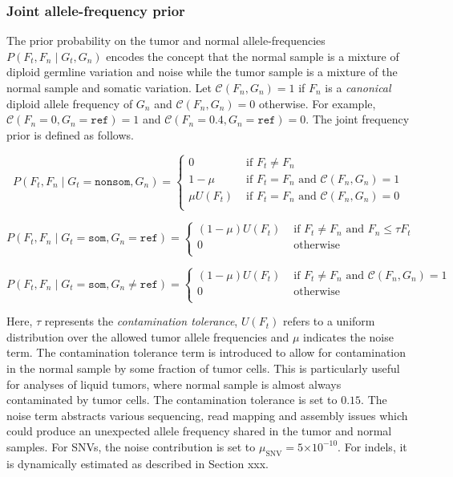 \documentclass{article}
\newcommand{\e}[1]{\ensuremath{\times 10^{#1}}}
\begin{document}
\subsubsection{Joint allele-frequency prior}
The prior probability on the tumor and normal allele-frequencies $P(F_t, F_n \mid G_t, G_n)$ encodes the concept that the normal sample is a mixture of diploid germline variation and noise while the tumor sample is a mixture of the normal sample and somatic variation. Let $\mathcal{C} (F_n, G_n) = 1$ if $F_n$ is a {\em canonical} diploid allele frequency of $G_n$ and $\mathcal{C} (F_n, G_n) = 0$ otherwise. For example, $\mathcal{C} (F_n=0, G_n = \texttt{ref}) = 1$ and $\mathcal{C} (F_n=0.4, G_n = \texttt{ref}) = 0$. The joint frequency prior is defined as follows.

\begin{equation*}
P(F_t, F_n \mid G_t = \texttt{nonsom}, G_n)=
\begin{cases}
	0 & \text{ if } F_t \neq F_n \\
	1-\mu & \text{ if } F_t = F_n \text{ and }\mathcal{C}(F_n, G_n) = 1 \\
	\mu U(F_t) & \text{ if } F_t = F_n \text{ and }\mathcal{C}(F_n, G_n) = 0 \\
\end{cases}
\end{equation*}

\begin{equation*}
P(F_t, F_n \mid G_t = \texttt{som}, G_n = \texttt{ref})=
\begin{cases}
	(1-\mu)U(F_t) & \text{ if } F_t \neq F_n \text{ and } F_n \leq \tau F_t \\
	0 & \text{ otherwise } \\
\end{cases}
\end{equation*}

\begin{equation*}
P(F_t, F_n \mid G_t = \texttt{som}, G_n \neq \texttt{ref})=
\begin{cases}
	(1-\mu)U(F_t) & \text{ if } F_t \neq F_n \text{ and } \mathcal{C}(F_n, G_n) = 1 \\
	0 & \text{ otherwise } \\
\end{cases}
\end{equation*}

\noindent Here, $\tau$ represents the {\em contamination tolerance}, $U(F_t)$ refers to a uniform distribution over the allowed tumor allele frequencies and $\mu$ indicates the noise term. The contamination tolerance term is introduced to allow for contamination in the normal sample by some fraction of tumor cells. This is particularly useful for analyses of liquid tumors, where normal sample is almost always contaminated by tumor cells. The contamination tolerance is set to $0.15$. The noise term abstracts various sequencing, read mapping and assembly issues which could produce an unexpected allele frequency shared in the tumor and normal samples. For SNVs, the noise contribution is set to $\mu_{\text{SNV}} = 5\e{-10}$. For indels, it is dynamically estimated as described in Section xxx.
\end{document}
